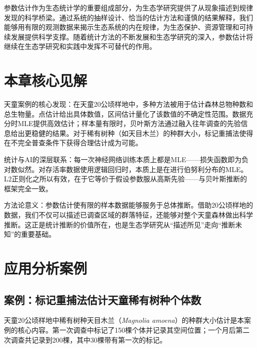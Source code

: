 \documentclass[
  twoside,12pt,fontset=none]{ctexbook}
\begin{document}
参数估计作为生态统计学的重要组成部分，为生态学研究提供了从现象描述到规律发现的科学桥梁。通过系统的抽样设计、恰当的估计方法和谨慎的结果解释，我们能够用有限的观测数据来揭示生态系统的内在规律，为生态保护、资源管理和可持续发展提供科学支撑。随着统计方法的不断发展和生态学研究的深入，参数估计将继续在生态学研究和实践中发挥不可替代的作用。

\hypertarget{ux672cux7ae0ux6838ux5fc3ux89c1ux89e3-2}{%
\section{本章核心见解}\label{ux672cux7ae0ux6838ux5fc3ux89c1ux89e3-2}}

天童案例的核心发现：在天童20公顷样地中，多种方法被用于估计森林总物种数和总生物量。点估计给出具体数值，区间估计量化了该数值的不确定性范围。数据充分时MLE提供高效估计；样本量有限时，贝叶斯方法通过融入往年调查的先验信息给出更稳健的结果。对于稀有树种（如天目木兰）的种群大小，标记重捕法使得在不完全普查条件下获得合理估计成为可能。

统计与AI的深层联系：每一次神经网络训练本质上都是MLE------损失函数即为负对数似然。对存活率数据使用逻辑回归时，本质上是在进行伯努利分布的MLE。L2正则化之所以有效，在于它等价于假设参数服从高斯先验------与贝叶斯推断的框架完全一致。

方法论意义：参数估计使有限的样本数据能够服务于总体推断。借助20公顷样地的数据，我们不仅可以描述已调查区域的群落特征，还能够对整个天童森林做出科学推断。这正是统计推断的价值所在，也是生态学研究从``描述所见''走向``推断未知''的重要基础。

\hypertarget{ux5e94ux7528ux5206ux6790ux6848ux4f8b-2}{%
\section{应用分析案例}\label{ux5e94ux7528ux5206ux6790ux6848ux4f8b-2}}

\hypertarget{ux6848ux4f8bux6807ux8bb0ux91cdux6355ux6cd5ux4f30ux8ba1ux5929ux7ae5ux7a00ux6709ux6811ux79cdux4e2aux4f53ux6570}{%
\subsection{案例：标记重捕法估计天童稀有树种个体数}\label{ux6848ux4f8bux6807ux8bb0ux91cdux6355ux6cd5ux4f30ux8ba1ux5929ux7ae5ux7a00ux6709ux6811ux79cdux4e2aux4f53ux6570}}

天童20公顷样地中稀有树种天目木兰（\emph{Magnolia amoena}）的种群大小估计是本案例的核心内容。第一次调查中标记了150棵个体并记录其空间位置；一个月后第二次调查共记录到200棵，其中30棵带有第一次的标记。
\end{document}
